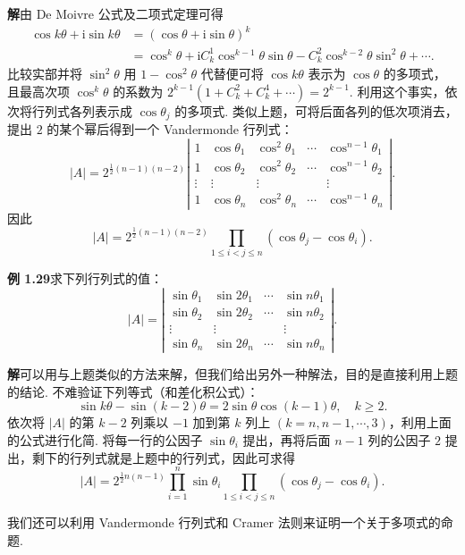 \documentclass[UTF8, 12pt, fontset=fandol, oneside]{ctexart}
\begin{document}
\noindent\textbf{解}\quad 由 De Moivre 公式及二项式定理可得
\[
\begin{aligned}
\cos k\theta+\mathrm{i}\sin k\theta
&=(\cos\theta+\mathrm{i}\sin\theta)^k\\
&=\cos^k\theta+\mathrm{i}C_k^1\cos^{k-1}\theta\sin\theta
-C_k^2\cos^{k-2}\theta\sin^2\theta+\cdots.
\end{aligned}
\]
比较实部并将 $\sin^2\theta$ 用 $1-\cos^2\theta$ 代替便可将 $\cos k\theta$ 表示为 $\cos\theta$ 的多项式，且最高次项 $\cos^k\theta$ 的系数为 $2^{k-1}(1+C_k^2+C_k^4+\cdots)=2^{k-1}$. 利用这个事实，依次将行列式各列表示成 $\cos\theta_j$ 的多项式. 类似上题，可将后面各列的低次项消去，提出 $2$ 的某个幂后得到一个 Vandermonde 行列式：
\[
|A|=2^{\frac12(n-1)(n-2)}
\left|\begin{array}{ccccc}
1 & \cos\theta_1 & \cos^2\theta_1 & \cdots & \cos^{n-1}\theta_1\\
1 & \cos\theta_2 & \cos^2\theta_2 & \cdots & \cos^{n-1}\theta_2\\
\vdots & \vdots & \vdots &        & \vdots\\
1 & \cos\theta_n & \cos^2\theta_n & \cdots & \cos^{n-1}\theta_n
\end{array}\right|.
\]
因此
\[
|A|=2^{\frac12(n-1)(n-2)}\prod_{1\le i<j\le n}(\cos\theta_j-\cos\theta_i).
\]

\noindent\textbf{例 1.29}\quad 求下列行列式的值：
\[
|A|=\left|\begin{array}{cccc}
\sin\theta_1 & \sin2\theta_1 & \cdots & \sin n\theta_1\\
\sin\theta_2 & \sin2\theta_2 & \cdots & \sin n\theta_2\\
\vdots & \vdots &        & \vdots\\
\sin\theta_n & \sin2\theta_n & \cdots & \sin n\theta_n
\end{array}\right|.
\]

\noindent\textbf{解}\quad 可以用与上题类似的方法来解，但我们给出另外一种解法，目的是直接利用上题的结论. 不难验证下列等式（和差化积公式）：
\[
\sin k\theta-\sin(k-2)\theta=2\sin\theta\cos(k-1)\theta,\quad k\ge2.
\]
依次将 $|A|$ 的第 $k-2$ 列乘以 $-1$ 加到第 $k$ 列上 $(k=n,n-1,\cdots,3)$，利用上面的公式进行化简. 将每一行的公因子 $\sin\theta_i$ 提出，再将后面 $n-1$ 列的公因子 $2$ 提出，剩下的行列式就是上题中的行列式，因此可求得
\[
|A|=2^{\frac12 n(n-1)}\prod_{i=1}^n\sin\theta_i
\prod_{1\le i<j\le n}(\cos\theta_j-\cos\theta_i).
\]

我们还可以利用 Vandermonde 行列式和 Cramer 法则来证明一个关于多项式的命题.
\end{document}
